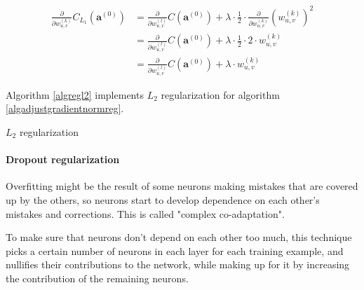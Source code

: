 \documentclass[titlepage]{article}
\begin{document}
            \begin{equation}
              \begin{split}
                \frac{\partial}{\partial w_{u,v}^{(k)}}
                  C_{L_1} \left( \mathbf{a}^{(0)} \right)
                    & = \frac{\partial}{\partial w_{u,v}^{(l)}}
                          C \left( \mathbf{a}^{(0)} \right)
                        +
                        \lambda
                        \cdot
                        \frac{1}{2}
                        \cdot
                        \frac{\partial}{\partial w_{u,v}^{(k)}}
                          \left( w_{u,v}^{(k)} \right)^2 \\
                    & = \frac{\partial}{\partial w_{u,v}^{(l)}}
                          C \left( \mathbf{a}^{(0)} \right)
                        +
                        \lambda \cdot \frac{1}{2} \cdot 2 \cdot w_{u,v}^{(k)} \\
                    & = \frac{\partial}{\partial w_{u,v}^{(l)}}
                          C \left( \mathbf{a}^{(0)} \right)
                        +
                        \lambda \cdot w_{u,v}^{(k)}
              \end{split}
            \end{equation}

            Algorithm \ref{algregl2} implements $L_2$ regularization for
            algorithm \ref{algadjustgradientnormreg}.

            \begin{algorithm}
              \caption{$L_2$ regularization} \label{algregl2}
              \begin{algorithmic}
                  \State {}
                \EndFunction
              \end{algorithmic}
            \end{algorithm}

        \paragraph{Dropout regularization}

          Overfitting might be the result of some neurons making mistakes that
          are covered up by the others, so neurons start to develop dependence
          on each other's mistakes and corrections. This is called "complex
          co-adaptation".

          To make sure that neurons don't depend on each other too much, this
          technique picks a certain number of neurons in each layer for each
          training example, and nullifies their contributions to the network,
          while making up for it by increasing the contribution of the
          remaining neurons.
\end{document}
